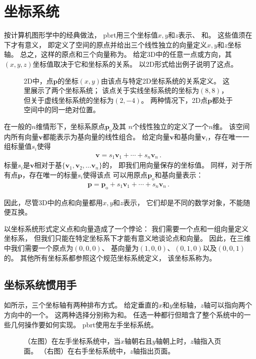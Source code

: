 \section{坐标系统}\label{sec:坐标系统}

按计算机图形学中的经典做法，
pbrt用三个坐标值$x,y$和$z$表示、
和。
这些值须在下才有意义，
即定义了空间的原点并给出三个线性独立的向量定义$x,y$和$z$坐标轴。
总之，这样的原点和三个向量称为。
给定3D中的任意一点或方向，其$(x,y,z)$坐标值取决于它和坐标系的关系。
以2D形式给出例子说明了这点。
\begin{figure}[htbp]
    \centering
    \caption{2D中，点$\bm p$的坐标$(x,y)$由该点与特定2D坐标系统的关系定义。
        这里展示了两个坐标系统；
        该点关于实线坐标系统的坐标为$(8,8)$，但关于虚线坐标系统的坐标为$(2,-4)$。
        两种情况下，2D点$\bm p$都处于空间中的同一绝对位置。}
    \label{fig:2.1}
\end{figure}

在一般的$n$维情形下，坐标系原点$\bm p_\mathrm{o}$及其
$n$个线性独立的定义了一个$n$维。
该空间内所有向量$\bm v$都能表示为基向量的线性组合。
给定向量$\bm v$和基向量$\bm v_i$，存在唯一一组标量值$s_i$使得
\begin{align*}
    \bm v=s_1\bm v_1+\cdots+s_n\bm v_n\, .
\end{align*}
标量$s_i$是$\bm v$相对于基$\{\bm v_1,\bm v_2,\ldots \bm v_n\}$的，
即我们用向量保存的坐标值。
同样，对于所有点$\bm p$，存在唯一的标量$s_i$使得该点
可以用原点$\bm p_\mathrm{o}$和基向量表示：
\begin{align*}
    \bm p=\bm p_\mathrm{o}+s_1\bm v_1+\cdots+s_n\bm v_n\, .
\end{align*}

因此，尽管3D中的点和向量都用$x,y$和$z$表示，
它们却是不同的数学对象，不能随便互换。

以坐标系统形式定义点和向量造成了一个悖论：
我们需要一个点和一组向量定义坐标系，
但我们只能在特定坐标系下才能有意义地谈论点和向量。
因此，在三维中我们需要一个原点为$(0,0,0)$、
基向量为$(1,0,0)$、$(0,1,0)$以及$(0,0,1)$
的。
其他所有坐标系都参照这个规范坐标系统定义，
该坐标系称为。

\subsection{坐标系统惯用手}\label{sub:坐标系统惯用手}
如所示，三个坐标轴有两种排布方式。
给定垂直的$x$和$y$坐标轴，$z$轴可以指向两个方向中的一个。
这两种选择分别称为和。
任选一种都行但暗含了整个系统中的一些几何操作要如何实现。
pbrt使用左手坐标系统。
\begin{figure}[htbp]
    \centering
    \caption{（左图）在左手坐标系统中，当$x$轴朝右且$y$轴朝上时，$z$轴指入页面。
        （右图）在右手坐标系统中，$z$轴指出页面。}
    \label{fig:2.2}
\end{figure}